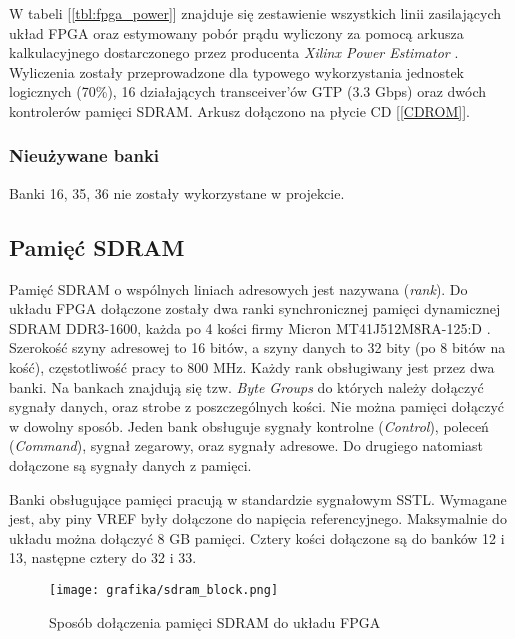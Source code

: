 W tabeli [\ref{tbl:fpga_power}] znajduje się zestawienie wszystkich linii zasilających układ FPGA oraz estymowany pobór prądu wyliczony za pomocą arkusza kalkulacyjnego dostarczonego przez producenta \textit{Xilinx Power Estimator} \cite{XPE} \cite{XPE:UG1} \cite{XPE:UG2}. Wyliczenia zostały przeprowadzone dla typowego wykorzystania jednostek logicznych (70\%), 16 działających transceiver'ów GTP (3.3 Gbps) oraz dwóch kontrolerów pamięci SDRAM. Arkusz dołączono na płycie CD [\ref{CDROM}].

\subsubsection{Nieużywane banki}
Banki 16, 35, 36 nie zostały wykorzystane w projekcie.
\subsection{Pamięć SDRAM}
Pamięć SDRAM o wspólnych liniach adresowych jest nazywana (\textit{rank}). Do układu FPGA dołączone zostały dwa ranki synchronicznej pamięci dynamicznej SDRAM DDR3-1600, każda po 4 kości firmy Micron MT41J512M8RA-125:D \cite{MT41}. Szerokość szyny adresowej to 16 bitów, a szyny danych to 32 bity (po 8 bitów na kość), częstotliwość pracy to 800 MHz. Każdy rank obsługiwany jest przez dwa banki. Na bankach znajdują się tzw. \textit{Byte Groups} do których należy dołączyć sygnały danych, oraz strobe z poszczególnych kości. Nie można pamięci dołączyć w dowolny sposób. Jeden bank obsługuje sygnały kontrolne (\textit{Control}), poleceń (\textit{Command}), sygnał zegarowy, oraz sygnały adresowe. Do drugiego natomiast dołączone są sygnały danych z pamięci. 

Banki obsługujące pamięci pracują w standardzie sygnałowym SSTL. Wymagane jest, aby piny VREF były dołączone do napięcia referencyjnego.  Maksymalnie do układu można dołączyć 8 GB pamięci. Cztery kości dołączone są do banków 12 i 13, następne cztery do 32 i 33.

\begin{figure}[here]
\begin{center}
\texttt{[image: grafika/sdram\_block.png]}
\end{center}
\caption{Sposób dołączenia pamięci SDRAM do układu FPGA}
\label{FPGA_SDRAM_BLOCK}
\end{figure}



